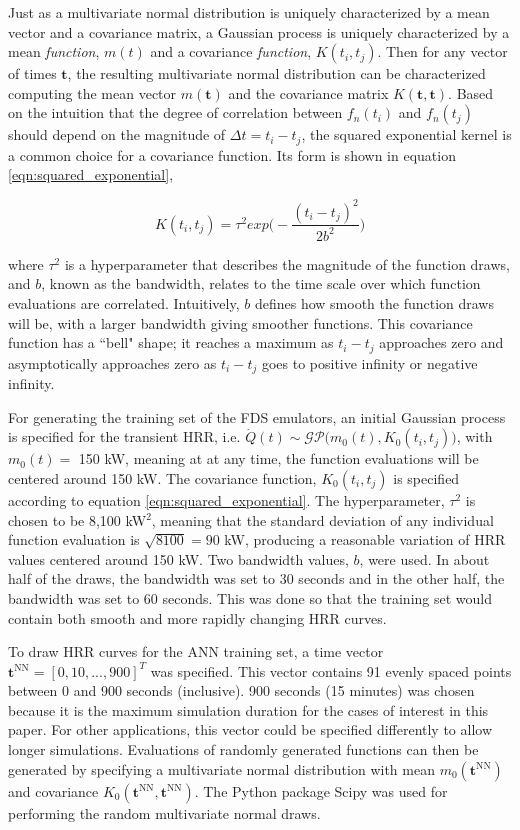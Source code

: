 \documentclass{article}
\begin{document}
Just as a multivariate normal distribution is uniquely characterized by a mean vector and a covariance matrix, a Gaussian process is uniquely characterized by a mean \textit{function}, $m(t)$ and a covariance \textit{function}, $K(t_i, t_j)$. Then for any vector of times $\boldsymbol{t}$, the resulting multivariate normal distribution can be characterized computing the mean vector $m(\boldsymbol{t})$ and the covariance matrix $K(\boldsymbol{t}, \boldsymbol{t})$. Based on the intuition that the degree of correlation between $f_n(t_i)$ and $f_n(t_j)$ should depend on the magnitude of $\Delta t = t_i - t_j$, the squared exponential kernel is a common choice for a covariance function. Its form is shown in equation \ref{eqn:squared_exponential}, 

 \begin{equation}
  \label{eqn:squared_exponential}
    K(t_i, t_j) = \tau^2exp\bigg(-\frac{(t_i-t_j)^2}{2b^2}\bigg)
\end{equation}

\noindent where $\tau^2$ is a hyperparameter that describes the magnitude of the function draws, and $b$, known as the bandwidth, relates to the time scale over which function evaluations are correlated. Intuitively, $b$ defines how smooth the function draws will be, with a larger bandwidth giving smoother functions. This covariance function has a ``bell" shape; it reaches a maximum as $t_i - t_j$ approaches zero and asymptotically approaches zero as $t_i - t_j$ goes to positive infinity or negative infinity. 

For generating the training set of the FDS emulators, an initial Gaussian process is specified for the transient HRR, i.e. $\dot{Q}(t)\sim \mathcal{GP}\bigg(m_0(t),K_0(t_i,t_j)\bigg)$, with $m_0(t)=$ 150 kW, meaning at at any time, the function evaluations will be centered around 150 kW. The covariance function, $K_0(t_i,t_j)$ is specified according to equation \ref{eqn:squared_exponential}. The hyperparameter, $\tau^2$ is chosen to be 8,100 kW$^{\text{2}}$, meaning that the standard deviation of any individual function evaluation is $\sqrt{8100} = 90$ kW, producing a reasonable variation of HRR values centered around 150 kW. Two bandwidth values, $b$,  were used. In about half of the draws, the bandwidth was set to 30 seconds and in the other half, the bandwidth was set to 60 seconds. This was done so that the training set would contain both smooth and more rapidly changing HRR curves. 


To draw HRR curves for the ANN training set, a time vector $\boldsymbol{t}^{\text{NN}} = [0, 10, ..., 900]^T$ was specified. This vector contains 91 evenly spaced points between 0 and 900 seconds (inclusive). 900 seconds (15 minutes) was chosen because it is the maximum simulation duration for the cases of interest in this paper. For other applications, this vector could be specified differently to allow longer simulations. Evaluations of randomly generated functions can then be generated by specifying a multivariate normal distribution with mean $m_0(\boldsymbol{t}^{\text{NN}})$ and covariance $K_0(\boldsymbol{t}^{\text{NN}},\boldsymbol{t}^{\text{NN}})$. The Python package Scipy \cite{jones2001scipy} was used for performing the random multivariate normal draws. 
\end{document}
